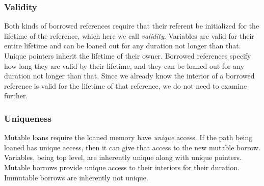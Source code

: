 \subsubsection*{Validity}
Both kinds of borrowed references require that their referent be initialized for
the lifetime of the reference, which here we call \emph{validity}.
Variables are valid for their entire lifetime and can be loaned out for any duration
not longer than that.
Unique pointers inherit the lifetime of their owner.
Borrowed references specify how long they are valid by their lifetime, and they
can be loaned out for any duration not longer than that. Since we already know
the interior of a borrowed reference is valid for the lifetime of that reference,
we do not need to examine further.
\newline



\subsubsection*{Uniqueness}
Mutable loans require the loaned memory have \emph{unique} access.
If the path being loaned has unique access, then it can give that access to the 
new mutable borrow.
Variables, being top level, are inherently unique along with unique pointers.
Mutable borrows provide unique access to their interiors for their duration.
Immutable borrows are inherently not unique.
\newline



